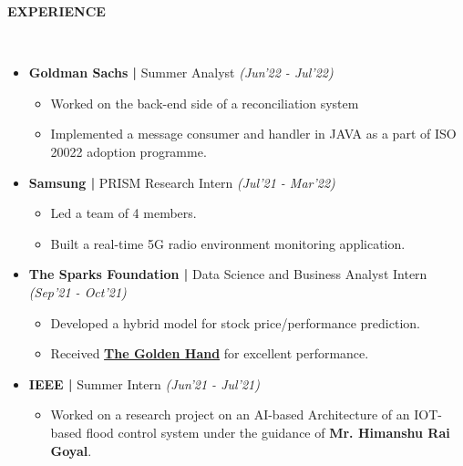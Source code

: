 \documentclass[a4paper,10pt]{article}
\newcommand{\lsep}{-0.5cm}
\newcommand{\resheading}[1]{{\small \colorbox{mygrey}{\begin{minipage}{0.98\textwidth}{\textbf{#1 \vphantom{p\^{E}}}}\end{minipage}}}}
\begin{document}
\resheading{\textbf{EXPERIENCE} }\\[\lsep]
\begin{itemize}[itemsep=0.01mm, parsep=0.1pt]
\item \textbf{Goldman Sachs |} Summer Analyst \textit{(Jun'22 - Jul'22)}
\begin{itemize}[itemsep=0.1mm]
\item Worked on the back-end side of a reconciliation system
\item Implemented a message consumer and handler in JAVA as a part of ISO 20022 adoption programme.
\end{itemize}
\item \textbf{Samsung |} PRISM Research Intern \textit{(Jul'21 - Mar'22)}
\begin{itemize}[itemsep=0.01mm]
\item Led a team of 4 members.
\item Built a real-time 5G radio environment monitoring application.
\end{itemize}
\item \textbf{The Sparks Foundation |} Data Science and Business Analyst Intern \textit{(Sep'21 - Oct'21)}
\begin{itemize}[itemsep=0.01mm]
\item Developed a hybrid model for stock price/performance prediction.
\item Received \href{https://truecertificates.com/verified/V5FZSXAR8E}{\textbf{The Golden Hand}} for excellent performance.
\end{itemize}
\item \textbf{IEEE |}  Summer Intern \textit{(Jun'21 - Jul'21)}
\begin{itemize}[itemsep=0.01mm]
\item Worked on a research project on an AI-based Architecture of an IOT-based flood control system under the guidance of \textbf{Mr. Himanshu Rai Goyal}.
\end{itemize}
\end{itemize}
\end{document}
